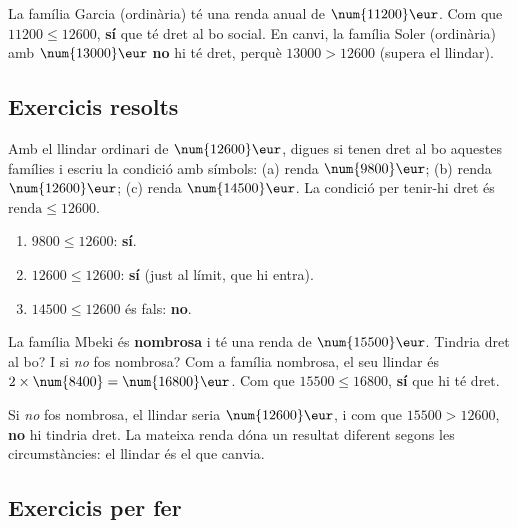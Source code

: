 \begin{exemple}
La família Garcia (ordinària) té una renda anual de $\num{11200}\eur$. Com que
$\num{11200}\le\num{12600}$, \textbf{sí} que té dret al bo social. En canvi, la
família Soler (ordinària) amb $\num{13000}\eur$ \textbf{no} hi té dret, perquè
$\num{13000}>\num{12600}$ (supera el llindar).
\end{exemple}

\subsection{Exercicis resolts}

\begin{exresolt}
Amb el llindar ordinari de $\num{12600}\eur$, digues si tenen dret al bo aquestes
famílies i escriu la condició amb símbols: (a) renda $\num{9800}\eur$; (b) renda
$\num{12600}\eur$; (c) renda $\num{14500}\eur$.
\solucio
La condició per tenir-hi dret és $\text{renda}\le\num{12600}$.
\begin{enumerate}[label=\alph*), leftmargin=1.6em]
  \item $\num{9800}\le\num{12600}$: \textbf{sí}.
  \item $\num{12600}\le\num{12600}$: \textbf{sí} (just al límit, que hi entra).
  \item $\num{14500}\le\num{12600}$ és fals: \textbf{no}.
\end{enumerate}
\end{exresolt}

\begin{exresolt}
La família Mbeki és \textbf{nombrosa} i té una renda de $\num{15500}\eur$. Tindria
dret al bo? I si \emph{no} fos nombrosa?
\solucio
Com a família nombrosa, el seu llindar és $2\times\num{8400}=\num{16800}\eur$. Com
que $\num{15500}\le\num{16800}$, \textbf{sí} que hi té dret.

Si \emph{no} fos nombrosa, el llindar seria $\num{12600}\eur$, i com que
$\num{15500}>\num{12600}$, \textbf{no} hi tindria dret. La mateixa renda dóna un
resultat diferent segons les circumstàncies: el llindar és el que canvia.
\end{exresolt}

\subsection{Exercicis per fer}

